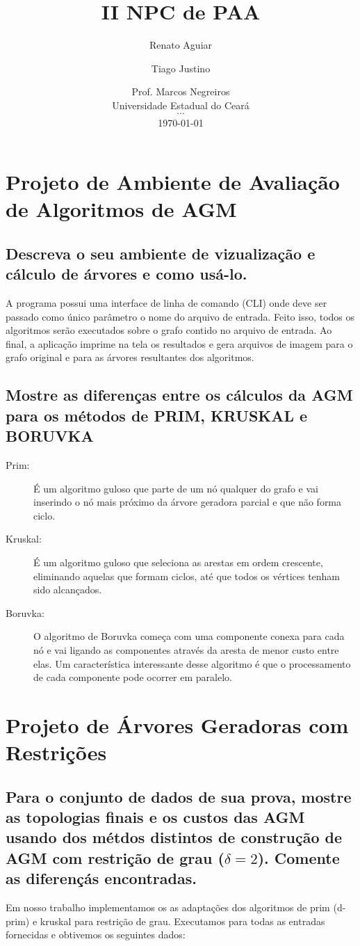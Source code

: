 \documentclass[12pt,a4paper]{article}
\title{II NPC de PAA}
\author{ Renato Aguiar \and Tiago Justino }
\date{
    Prof. Marcos Negreiros \\
	Universidade Estadual do Ceará \\
	$\cdots$ \\
	\today
}
\begin{document}
\maketitle

\section{Projeto de Ambiente de Avaliação de Algoritmos de AGM}
\subsection{Descreva o seu ambiente de vizualização e cálculo de árvores e como
usá-lo.}

A programa possui uma interface de linha de comando (CLI) onde deve ser passado
como único parâmetro o nome do arquivo de entrada. Feito isso, todos os
algoritmos serão executados sobre o grafo contido no arquivo de entrada. Ao
final, a aplicação imprime na tela os resultados e gera arquivos de imagem para
o grafo original e para as árvores resultantes dos algoritmos.

\subsection{Mostre as diferenças entre os cálculos da AGM para os métodos de
PRIM, KRUSKAL e BORUVKA}

\begin{description}
\item[Prim:] É um algoritmo guloso que parte de um nó qualquer do grafo e vai
inserindo o nó mais próximo da árvore geradora parcial e que não forma ciclo.
\item[Kruskal:] É um algoritmo guloso que seleciona as arestas em ordem crescente,
eliminando aquelas que formam ciclos, até que todos os vértices tenham sido
alcançados.
\item[Boruvka:] O algoritmo de Boruvka começa com uma componente conexa para
cada nó e vai ligando as componentes através da aresta de menor custo entre
elas. Um característica interessante desse algoritmo é que o processamento de
cada componente pode ocorrer em paralelo.
\end{description}

\section{Projeto de Árvores Geradoras com Restrições}

\subsection{Para o conjunto de dados de sua prova, mostre as topologias finais e
os custos das AGM usando dos métdos distintos de construção de AGM com restrição
de grau ($\delta=2$). Comente as diferençás encontradas.}

Em nosso trabalho implementamos os as adaptações dos algoritmos de prim (d-prim)
e kruskal para restrição de grau. Executamos para todas as entradas fornecidas e
obtivemos os seguintes dados:


\end{document}
